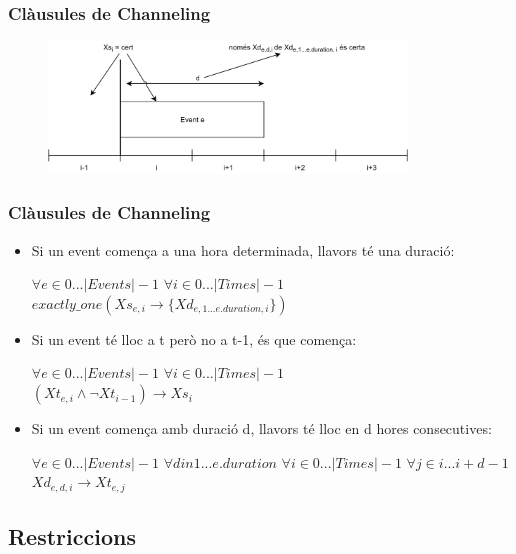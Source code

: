 \documentclass[11pt]{beamer}
\begin{document}
  \begin{frame}
    \frametitle{Clàusules de Channeling} 
    \begin{figure}[p]
      \includegraphics[width=0.85\textwidth]{Diagrames/DiagramaChanneling.png}
      \label{fig:procs}
    \end{figure} 

  
    \end{frame}
  

  \begin{frame}
  \frametitle{Clàusules de Channeling}  

  \begin{itemize}
    \item Si un event comença a una hora determinada, llavors té una duració: 
  \begin{center} $\forall e \in 0 ... |Events|-1$ $\forall i \in 0 ... |Times|-1$ \\$exactly\_one(Xs_{e,i} \rightarrow \{Xd_{e,1 ... e.duration,i}\})$\end{center}
    \item Si un event té lloc a t però no a t-1, és que comença: 
  \begin{center} 
  $\forall e \in 0 ... |Events|-1$ $\forall i \in 0 ... |Times|-1$ \\$(Xt_{e,i} \land \neg Xt_{i-1}) \rightarrow Xs_i$ \end{center}
    \item Si un event comença amb duració d, llavors té lloc en d hores consecutives: 
    \begin{center} 
      $\forall e \in 0 ... |Events|-1$ $\forall d in 1 ... e.duration$ $\forall i \in 0 ... |Times|-1$ $\forall j \in i ... i+d-1$ \\
      $Xd_{e,d,i} \rightarrow Xt_{e,j}$    
    \end{center}
  \end{itemize}

  \end{frame}

  \subsection{Restriccions}
\end{document}
